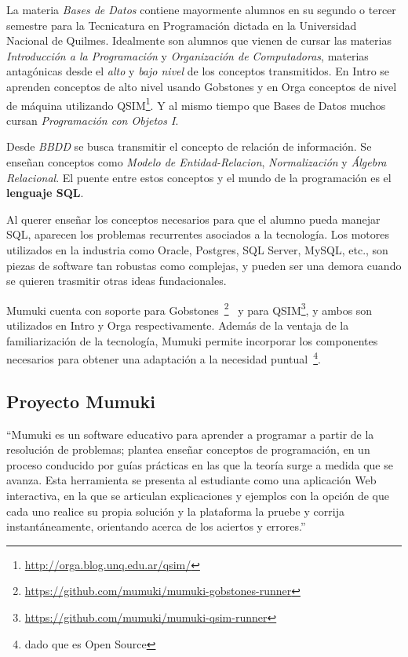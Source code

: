 
La materia \textit{Bases de Datos} contiene mayormente
alumnos en su segundo o tercer semestre para
la Tecnicatura en Programación dictada en la Universidad
Nacional de Quilmes. Idealmente son alumnos que
vienen de cursar las materias \textit{Introducción
a la Programación} y \textit{Organización de Computadoras},
materias antagónicas desde el \textit{alto} y \textit{bajo nivel}
de los conceptos transmitidos. En Intro se aprenden conceptos
de alto nivel usando Gobstones y en Orga conceptos de nivel
de máquina utilizando QSIM\footnote{\url{http://orga.blog.unq.edu.ar/qsim/}}.
Y al mismo tiempo que Bases de Datos muchos cursan
\textit{Programación con Objetos I}.

Desde \textit{BBDD} se busca transmitir el concepto de relación
de información. Se enseñan conceptos como \textit{Modelo de
Entidad-Relacion}, \textit{Normalización} y \textit{Álgebra Relacional}.
El puente entre estos conceptos y el mundo de la programación
es el \textbf{lenguaje SQL}.

Al querer enseñar los conceptos necesarios para que el alumno
pueda manejar SQL, aparecen los problemas recurrentes asociados
a la tecnología. Los motores utilizados en la industria como
Oracle, Postgres, SQL Server, MySQL, etc., son piezas de software
tan robustas como complejas, y pueden ser una demora cuando se
quieren trasmitir otras ideas fundacionales.

Mumuki cuenta con soporte para Gobstones~\footnote{\url{https://github.com/mumuki/mumuki-gobstones-runner}}~\cite{MumukiGobstonesAloi}
y para QSIM\footnote{\url{https://github.com/mumuki/mumuki-qsim-runner}},
y ambos son utilizados en Intro y Orga respectivamente.
Además de la ventaja de la familiarización de la tecnología,
Mumuki permite incorporar los componentes necesarios para
obtener una adaptación a la necesidad puntual~\footnote{dado que
es Open Source}.


\subsection{Proyecto Mumuki}

\begin{displayquote}
``Mumuki es un software educativo para aprender a programar a partir de la resolución de problemas;
plantea enseñar conceptos de programación, en un proceso conducido por guías prácticas
en las que la teoría surge a medida que se avanza. Esta herramienta se presenta al
estudiante como una aplicación Web interactiva, en la que se articulan explicaciones
y ejemplos con la opción de que cada uno realice su propia solución y la plataforma
la pruebe y corrija instantáneamente, orientando acerca de los aciertos y errores.''
\end{displayquote}

